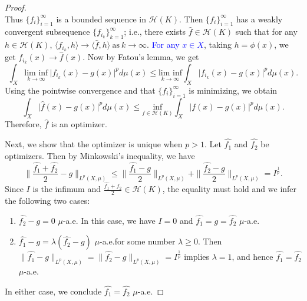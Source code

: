 \documentclass[10pt,a4paper]{amsart}
\begin{document}
\begin{proof}
\begin{equation*}
\end{equation*}
Thus  $\{f_i\}_{i=1}^{\infty}$ is a bounded sequence in $\mathscr{H}(K)$. Then $\{f_i\}_{i=1}^{\infty}$ has a weakly convergent subsequence $\{f_{i_k}\}_{k=1}^{\infty}$; i.e., there exists  $\hat{f} \in \mathscr{H}(K)$ such that for any $h \in \mathscr{H}(K)$, $  \langle f_{i_k}, h \rangle \rightarrow \langle \hat{f}, h \rangle \ \text{as} \ k \rightarrow \infty.$
\textcolor{blue}{For any $x \in X$}, taking $h = \phi(x)$, we get $f_{i_k}(x) \rightarrow \hat{f}(x)$.
Now by Fatou's lemma, we get 
\begin{equation*}
     \int_{X}  \underset{k \rightarrow \infty}{\text{lim inf}} \ \vert f_{i_k}(x) - g(x) \vert ^p d\mu(x) \leq  \underset{k \rightarrow \infty}{\text{lim inf}} \int_{X}  \vert f_{i_k}(x) - g(x) \vert ^p d\mu(x).
\end{equation*}
Using the pointwise convergence and that $\{f_i\}_{i=1}^{\infty}$ is minimizing, we obtain
\begin{equation*}
     \int_{X}  \vert \hat{f}(x) - g(x) \vert ^p d\mu(x) \leq  \underset{f \in \mathscr{H}(K)}{\text{inf}} \int_{X}  \vert f(x) - g(x) \vert ^p d\mu(x).
\end{equation*}
Therefore, $\hat{f}$ is an optimizer. 
\par
Next, we show that the optimizer is unique when $p>1$.
 Let $\hat{f_1}$ and $\hat{f_2}$ be optimizers. Then by Minkowski's inequality, we have
\begin{equation*}
    \| \frac{\hat{f_1}+\hat{f_2}}{2}-g \|_{L^p(X,\mu)} \leq \|\frac{\hat{f_1}-g}{2} \|_{L^p(X,\mu)} + \|\frac{\hat{f_2}-g}{2} \|_{L^p(X,\mu)}=I^\frac{1}{p}.
\end{equation*}
Since $I$ is the infimum and $\frac{\hat{f_1}+\hat{f_2}}{2} \in \mathscr{H}(K)$, the equality must hold and we infer the following two cases:
\begin{enumerate}
    \item $\hat{f_2}-g=0$ $\mu$-a.e.
    In this case, we have $I=0$ and $\hat{f_1}=g=\hat{f_2}$ $\mu$-a.e.

    \item $\hat{f_1}-g=\lambda(\hat{f_2}-g)$ $\mu$-a.e.\@ for some number $\lambda\geq 0$. Then $ \|\hat{f_1}-g \|_{L^p(X,\mu)} = \|\hat{f_2}-g \|_{L^p(X,\mu)} = I^{\frac{1}{p}}$ implies $\lambda=1$, and hence $\hat{f_1}=\hat{f_2}$ $\mu$-a.e. 
\end{enumerate}
In either case, we conclude $\hat{f_1}=\hat{f_2}$ $\mu$-a.e. 
\end{proof}
\end{document}
